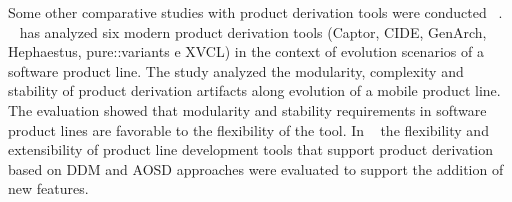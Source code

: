 Some other comparative studies with product derivation tools were conducted ~\citep{DBLP:conf/gpce/TorresKSBTBCLBM10, uiraWBDDM:2010}. 
~\citep{DBLP:conf/gpce/TorresKSBTBCLBM10} has analyzed six modern product derivation tools (Captor, CIDE, GenArch, Hephaestus, pure::variants e XVCL) in the context of evolution scenarios of a software product line. The study analyzed the modularity, complexity and stability of product derivation artifacts along  evolution of a mobile product line. The evaluation showed that  modularity and  stability requirements in software product lines are favorable to the flexibility of the tool.
In ~\citep{uiraWBDDM:2010} the flexibility and extensibility of product line development tools that support product derivation based on DDM and AOSD approaches were evaluated to support the addition of new features.

